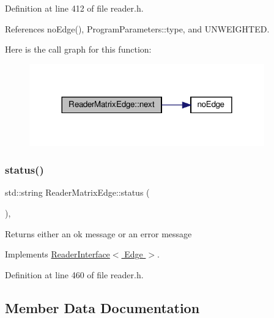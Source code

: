 Definition at line 412 of file reader.\+h.



References no\+Edge(), Program\+Parameters\+::type, and U\+N\+W\+E\+I\+G\+H\+T\+ED.

Here is the call graph for this function\+:
\nopagebreak
\begin{figure}[H]
\begin{center}
\leavevmode
\includegraphics[width=288pt]{classReaderMatrixEdge_a98657215956d975c4f81b7e1d6e90b3e_cgraph}
\end{center}
\end{figure}
\mbox{\label{classReaderMatrixEdge_a14cfd06f703e6a24d007514e5dee24ff}} 
\subsubsection{\texorpdfstring{status()}{status()}}
{\footnotesize\ttfamily std\+::string Reader\+Matrix\+Edge\+::status (\begin{DoxyParamCaption}{ }\end{DoxyParamCaption})\hspace{0.3cm}{\ttfamily [inline]}, {\ttfamily [virtual]}}

\begin{DoxyReturn}{Returns}
either an ok message or an error message 
\end{DoxyReturn}


Implements \hyperlink{classReaderInterface_a5f86ed49eac808ed0a912f7d670c4042}{Reader\+Interface$<$ Edge $>$}.



Definition at line 460 of file reader.\+h.



\subsection{Member Data Documentation}
\mbox{\label{classReaderMatrixEdge_ab8d64c5359cb60152b277b735616f3fd}} 
